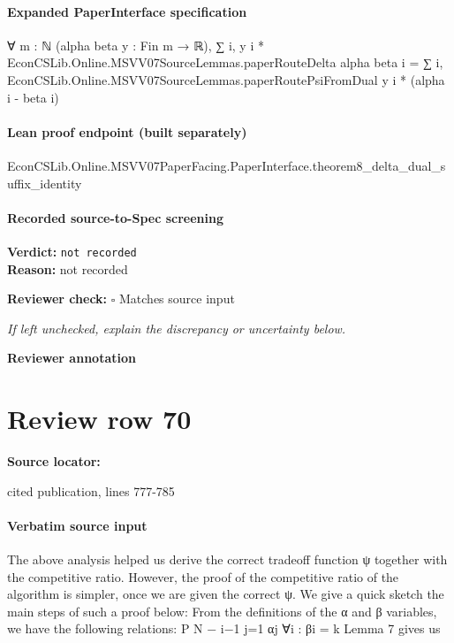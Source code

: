 \documentclass[10pt]{article}
\newcommand{\reviewerbox}{%
  \par\noindent\fbox{\parbox{0.96\linewidth}{\rule{0pt}{0.38in}}}\par
}
\newcommand{\reviewmatch}[1]{%
  \par\noindent\textbf{Reviewer check:} $\square$\; #1\par
  \noindent\emph{If left unchecked, explain the discrepancy or uncertainty below.}\par
}
\begin{document}
\paragraph{Expanded PaperInterface specification}
\begin{ReviewVerbatim}
∀ {m : ℕ} (alpha beta y : Fin m → ℝ),
  ∑ i, y i * EconCSLib.Online.MSVV07SourceLemmas.paperRouteDelta alpha beta i =
    ∑ i, EconCSLib.Online.MSVV07SourceLemmas.paperRoutePsiFromDual y i * (alpha i - beta i)
\end{ReviewVerbatim}

\paragraph{Lean proof endpoint (built separately)}\begin{ReviewVerbatim}
EconCSLib.Online.MSVV07PaperFacing.PaperInterface.theorem8_delta_dual_suffix_identity
\end{ReviewVerbatim}

\paragraph{Recorded source-to-Spec screening}
\textbf{Verdict:} \texttt{not recorded}
\\
\textbf{Reason:} not recorded
\reviewmatch{Matches source input}
\noindent\textbf{Reviewer annotation}\par
\reviewerbox
\clearpage
\hypertarget{source-claim-b27abfebf6e07f71}{}
\section*{Review row 70}
\textbf{Source locator:} {\footnotesize\raggedright cited publication, lines 777-\allowbreak{}785\par}
\paragraph{Verbatim source input}
\begin{ReviewVerbatim}
The above analysis helped us derive the correct tradeoff function ψ together with the competitive ratio. However, the proof of the competitive ratio of the algorithm is simpler, once we
are given the correct ψ. We give a quick sketch the main steps of such a proof below:
From the definitions of the α and β variables, we have the following relations:
P
N − i−1
j=1 αj
∀i : βi =
k
Lemma 7 gives us
\end{ReviewVerbatim}
\end{document}
